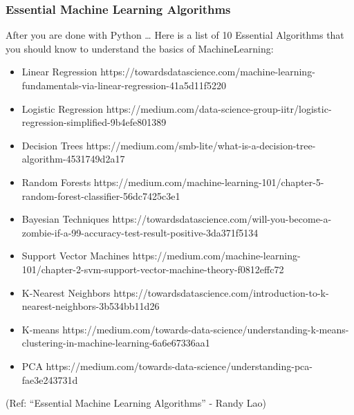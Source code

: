 \begin{frame}\frametitle{Essential Machine Learning Algorithms}
After you are done with Python \ldots
Here is a list of 10 Essential Algorithms that you should know to understand the basics of MachineLearning: 
\footnotesize
\begin{itemize}

\item Linear Regression
https://towardsdatascience.com/machine-learning-fundamentals-via-linear-regression-41a5d11f5220


\item Logistic Regression
https://medium.com/data-science-group-iitr/logistic-regression-simplified-9b4efe801389


\item  Decision Trees
https://medium.com/smb-lite/what-is-a-decision-tree-algorithm-4531749d2a17

\item Random Forests
https://medium.com/machine-learning-101/chapter-5-random-forest-classifier-56dc7425c3e1


\item  Bayesian Techniques
https://towardsdatascience.com/will-you-become-a-zombie-if-a-99-accuracy-test-result-positive-3da371f5134

\item  Support Vector Machines
https://medium.com/machine-learning-101/chapter-2-svm-support-vector-machine-theory-f0812effc72


\item  K-Nearest Neighbors
https://towardsdatascience.com/introduction-to-k-nearest-neighbors-3b534bb11d26


\item K-means
https://medium.com/towards-data-science/understanding-k-means-clustering-in-machine-learning-6a6e67336aa1

\item PCA
https://medium.com/towards-data-science/understanding-pca-fae3e243731d
\end{itemize}

(Ref: ``Essential Machine Learning Algorithms'' - Randy Lao)
\end{frame}

